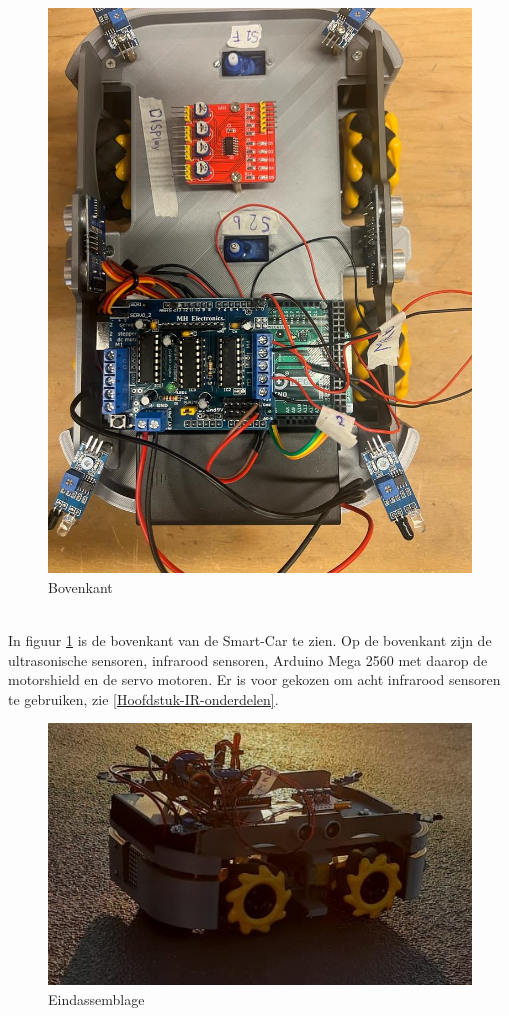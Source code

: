 \begin{figure}[h]
    \centering
    \includegraphics[scale = 0.20]{Media/Figuren/assembleren bovenkant.jpg}
    \caption{Bovenkant}
    \label{Bovenkant-Smart-Car}
\end{figure}
\\
In figuur \ref{Bovenkant-Smart-Car} is de bovenkant van de \gls{Smart-Car} te zien. Op de bovenkant zijn de ultrasonische sensoren,  infrarood sensoren, Arduino Mega 2560 met daarop de motorshield en de servo motoren. Er is voor gekozen om acht infrarood sensoren te gebruiken, zie \ref{Hoofdstuk-IR-onderdelen}. 
\\
\begin{figure}[h]
    \centering
    \includegraphics[scale = 0.7]{Media/Figuren/assembleren totaal.jpg}
    \caption{Eindassemblage}
    \label{Eindresultaat-Smart-Car}
\end{figure}
